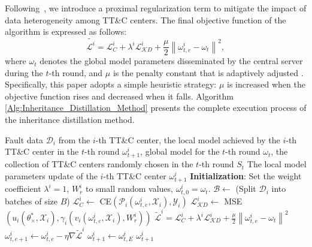 Following~\cite{li2020federated}, we introduce a proximal regularization term to mitigate the impact of data heterogeneity among TT\&C centers. The final objective function of the algorithm is expressed as follows:
\begin{equation}
	{{\tilde {\mathcal  L^i}}} = \mathcal L_C^i + {\lambda ^i}\mathcal L_{\mathcal KD}^i + \frac{\mu }{2}{\left\| {\omega _{t,e}^i - {\omega _t}} \right\|^2},
\end{equation}
where ${\omega _t}$ denotes the global model parameters disseminated by the central server during the $t$-th round, 
and $\mu$ is the penalty constant that is adaptively adjusted \cite{li2020federated}. 
Specifically, this paper adopts a simple heuristic strategy: 
$\mu$ is increased when the objective function rises and decreased when it falls.
Algorithm \ref{Alg:Inheritance_Distillation_Method} presents the complete execution process of the inheritance distillation method.

\begin{algorithm}[t]
	\caption{Inheritance Distillation Method}
	\label{Alg:Inheritance_Distillation_Method}
	\begin{algorithmic}[1]
		\REQUIRE Fault data ${{\mathscr D}_{i}}$ from the $i$-th TT\&C center, the local model achieved by the $i$-th TT\&C center in the $t$-th round $\omega _{t + 1}^i$, global model for the $t$-th round ${\omega _t}$, the collection of TT\&C centers randomly chosen in the $t$-th round ${S_t}$
		\ENSURE The local model parameters update of the $i$-th TT\&C center $\omega _{t + 1}^i$
		\STATE \textbf{Initialization}: Set the weight coefficient ${\lambda ^i} = 1$, $W_r^i$ to small random values, $\omega _{t,0}^i = {\omega _t}$.
		\STATE $\mathcal B \leftarrow $ (Split ${{\mathscr D}_{i}}$ into batches of size $B$)
		\STATE $\mathcal  L_C^i \leftarrow$ CE$\left( {{\mathcal P_i}\left( {\omega _{t,e}^i,{\mathcal X_i}} \right),{\mathcal Y_i}} \right)$
		\STATE ${\mathcal L_{\mathcal KD}^i} \leftarrow$ MSE$\left( {{u_i}\left( {\theta _ \times ^ * ,{\mathcal X_i}} \right),{\gamma _i}\left( {{v_i}\left( {\omega _{t,e}^i,{\mathcal X_i}} \right),W_r^i} \right)} \right)$
		\STATE ${ {\tilde { \mathcal L}^i}} = \mathcal L_C^i + {\lambda ^i} {\mathcal L_{\mathcal KD}^i} + \frac{\mu }{2}{\left\| {\omega _{t,e}^i - {\omega _t}} \right\|^2}$
		\STATE $\omega _{t,e + 1}^i \leftarrow \omega _{t,e}^i - {\eta}\nabla  {\tilde {\mathcal L}^i}$
		\ENDFOR
		\ENDFOR
		\STATE $\omega _{t + 1}^i \leftarrow \omega _{t,E}^i$
		\RETURN $\omega _{t + 1}^i$
	\end{algorithmic}
\end{algorithm}

